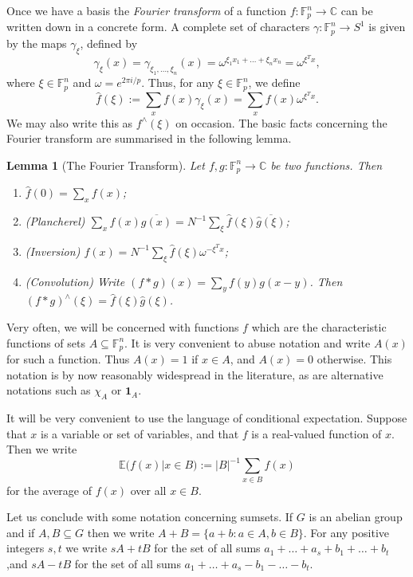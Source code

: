 \documentclass[12pt,a4paper,reqno]{amsart}
\numberwithin{equation}{section}
\theoremstyle{plain}
\newtheorem{lemma}[subsection]{Lemma}
\theoremstyle{definition}
\begin{document}
\noindent Once we have a basis the \textit{Fourier transform} of a function $f : \mathbb{F}_p^n \rightarrow \mathbb{C}$ can be written down in a concrete form. A complete set of characters $\gamma : \mathbb{F}_p^n \rightarrow S^1$ is given by the maps $\gamma_{\xi}$, defined by
\[ \gamma_{\xi}(x) = \gamma_{\xi_1,\dots,\xi_n}(x) = \omega^{\xi_1 x_1 + \dots + \xi_n x_n} = \omega^{\xi^{T}x},\] where $\xi \in \mathbb{F}_p^n$ and $\omega = e^{2\pi i/p}$. Thus, for any $\xi \in \mathbb{F}_p^n$, we define
\[ \widehat{f}(\xi) := \sum_x f(x) \gamma_{\xi}(x) = \sum_x f(x) \omega^{\xi^Tx}.\]
We may also write this as $f^{\wedge}(\xi)$ on occasion.
The basic facts concerning the Fourier transform are summarised in the following lemma.
\begin{lemma}[The Fourier Transform]\label{basic-fourier-properties}
Let $f,g : \mathbb{F}_p^n \rightarrow \mathbb{C}$ be two functions. Then
\begin{enumerate}
\item $\widehat{f}(0) = \sum_{x} f(x)$;
\item \textup{(Plancherel)} $\sum_x f(x)\overline{g(x)} = N^{-1} \sum_{\xi} \widehat{f}(\xi)\overline{\widehat{g}(\xi)}$;
\item \textup{(Inversion)} $f(x) = N^{-1} \sum_{\xi} \widehat{f}(\xi) \omega^{-\xi^T x}$;
\item \textup{(Convolution)} Write $(f \ast g)(x) = \sum_y f(y)g(x - y)$. Then $(f \ast g)^{\wedge}(\xi) = \widehat{f}(\xi)\widehat{g}(\xi)$.
\end{enumerate}
\end{lemma}
\noindent Very often, we will be concerned with functions $f$ which are the characteristic functions of sets $A \subseteq \mathbb{F}_p^n$. It is very convenient to abuse notation and write $A(x)$ for such a function. Thus $A(x) = 1$ if $x \in A$, and $A(x) = 0$ otherwise. This notation is by now reasonably widespread in the literature, as are alternative notations such as $\chi_A$ or $\mathbf{1}_A$.\vspace{11pt}

\noindent It will be very convenient to use the language of conditional expectation. Suppose that $x$ is a variable or set of variables, and that $f$ is a real-valued function of $x$. Then we write
\[ \mathbb{E}(f(x) | x \in B) := |B|^{-1}\sum_{x \in B} f(x)\]
for the average of $f(x)$ over all $x \in B$.\vspace{11pt}

\noindent Let us conclude with some notation concerning sumsets. If $G$ is an abelian group and if $A,B \subseteq G$ then we write $A + B = \{a + b : a \in A, b \in B\}$. For any positive integers $s,t$ we write $sA + tB$ for the set of all sums $a_1 + \dots + a_s + b_1 + \dots + b_t$,and $sA - tB$ for the set of all sums $a_1 + \dots + a_s - b_1 - \dots - b_t$.
\end{document}
